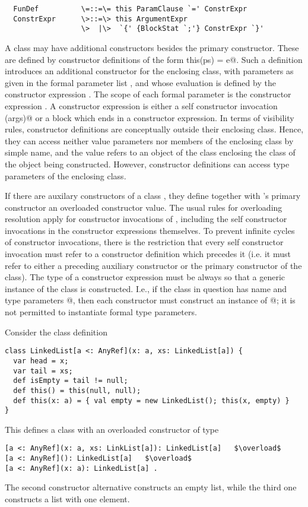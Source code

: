 \documentclass[11pt]{report}
\begin{document}
\syntax\begin{verbatim}
  FunDef          \=::=\= this ParamClause `=' ConstrExpr
  ConstrExpr      \>::=\> this ArgumentExpr
                  \>  |\>  `{' {BlockStat `;'} ConstrExpr `}'
\end{verbatim}

A class may have additional constructors besides the primary
constructor.  These are defined by constructor definitions of the form
\verb@def this(ps) = e@.  Such a definition introduces an additional
constructor for the enclosing class, with parameters as given in the
formal parameter list \verb@ps@, and whose evaluation is defined by
the constructor expression \verb@e@.  The scope of each formal
parameter is the constructor expression \verb@e@.  A constructor
expression is either a self constructor invocation \verb@this(args)@
or a block which ends in a constructor expression.  In terms of
visibility rules, constructor definitions are conceptually outside
their enclosing class.  Hence, they can access neither value
parameters nor members of the enclosing class by simple name, and the
value \verb@this@ refers to an object of the class enclosing the class
of the object being constructed. However, constructor definitions can
access type parameters of the enclosing class.

If there are auxilary constructors of a class \verb@C@, they define
together with \verb@C@'s primary constructor an overloaded constructor
value. The usual rules for overloading resolution
 apply for constructor invocations of \verb@C@,
including the self constructor invocations in the constructor
expressions themselves. To prevent infinite cycles of constructor
invocations, there is the restriction that every self constructor
invocation must refer to a constructor definition which precedes it
(i.e. it must refer to either a preceding auxiliary constructor or the
primary constructor of the class).  The type of a constructor
expression must be always so that a generic instance of the class is
constructed.  I.e., if the class in question has name \verb@C@ and type
parameters \verb@[tps]@, then each constructor must construct an
instance of \verb@C[tps]@; it is not permitted to instantiate formal
type parameters.

\example Consider the class definition

\begin{verbatim}
class LinkedList[a <: AnyRef](x: a, xs: LinkedList[a]) {
  var head = x;
  var tail = xs;
  def isEmpty = tail != null;  
  def this() = this(null, null);
  def this(x: a) = { val empty = new LinkedList(); this(x, empty) }
}
\end{verbatim}
This defines a class \verb@LinkedList@ with an overloaded constructor of type
\begin{verbatim}
[a <: AnyRef](x: a, xs: LinkList[a]): LinkedList[a]   $\overload$
[a <: AnyRef](): LinkedList[a]   $\overload$
[a <: AnyRef](x: a): LinkedList[a] .
\end{verbatim}
The second constructor alternative constructs an empty list, while the
third one constructs a list with one element.
\end{document}
